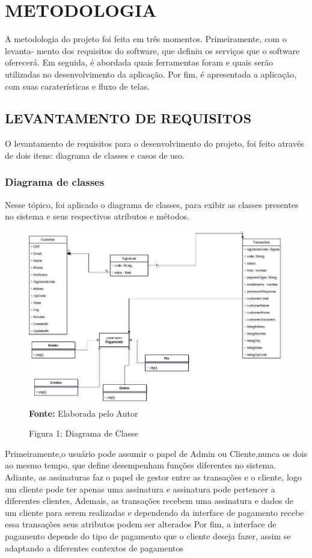 \documentclass[a4paper,12pt]{article}
\begin{document}
\section{METODOLOGIA}
\hspace{0.5cm}A metodologia do projeto foi feita em três momentos. Primeiramente, com o levanta-
mento dos requisitos do software, que definiu os serviços que o software oferecerá. Em seguida,
é abordada quais ferramentas foram e quais serão utilizadas no desenvolvimento da aplicação.
Por fim, é apresentada a aplicação, com suas caraterísticas e fluxo de telas.
\subsection{LEVANTAMENTO DE REQUISITOS}
\hspace{0.5cm}O levantamento de requisitos para o desenvolvimento do projeto, foi feito através de dois
itens: diagrama de classes e casos de uso.
\clearpage
\subsubsection{Diagrama de classes}
\hspace{0.5cm}Nesse tópico, foi aplicado o diagrama de classes, para exibir as classes presentes no
sistema e seus respectivos atributos e métodos.
\begin{figure}[ht!]
    \centering
    \caption{Figura 1: Diagrama de Classe}
    \includegraphics[width=15cm]{imagens/diagrama de Classe.png}
    \textbf{Fonte:} Elaborada pelo Autor
\end{figure}
\hspace{0.5cm}Primeiramente,o usuário pode assumir o papel de Admin ou Cliente,nunca os dois ao mesmo tempo, que define desempenham funções diferentes no sistema.
Adiante, as assinaturas faz o papel de gestor entre as transações e o cliente, logo um cliente pode ter apenas uma assinatura e assinatura pode pertencer a diferentes clientes,
Ademais, as transações recebem uma assinatura e dados de um cliente para serem realizadas e dependendo da interface de pagamento recebe essa transações seus atributos podem ser alterados
Por fim, a interface de pagamento depende do tipo de pagamento que o cliente deseja fazer, assim se adaptando a diferentes contextos de pagamentos
\end{document}
